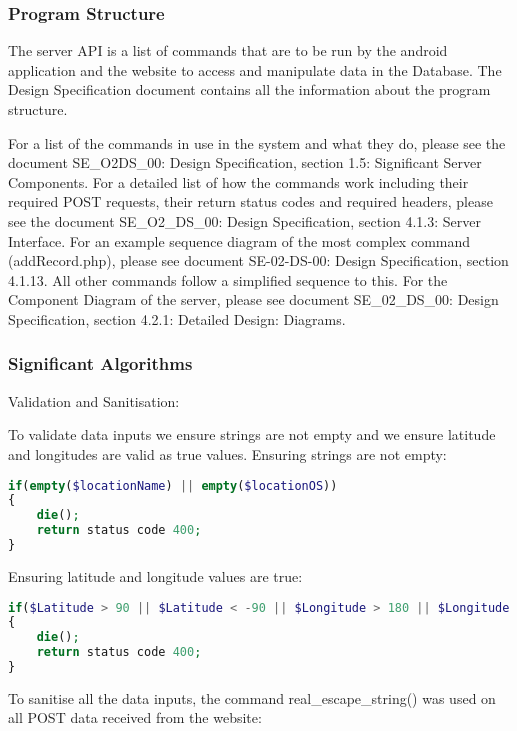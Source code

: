     \subsubsection{Program Structure}
        The server API is a list of commands that are to be run by the android application and the website to access and manipulate data in the Database. The Design Specification document contains all the information about the program structure.

        For a list of the commands in use in the system and what they do, please see the document SE\_O2\-DS\_00: Design Specification, section 1.5: Significant Server Components. For a detailed list of how the commands work including their required POST requests, their return status codes and required headers, please see the document SE\_O2\_DS\_00: Design Specification, section 4.1.3: Server Interface. For an example sequence diagram of the most complex command (addRecord.php), please see document SE-02-DS-00: Design Specification, section 4.1.13. All other commands follow a simplified sequence to this. For the Component Diagram of the server, please see document SE\_02\_DS\_00: Design Specification, section 4.2.1: Detailed Design: Diagrams. 

    \subsubsection{Significant Algorithms}

        Validation and Sanitisation:

        To validate data inputs we ensure strings are not empty and we ensure latitude and longitudes are valid as true values. Ensuring strings are not empty: 
        
        \begin{lstlisting}[language=php]
if(empty($locationName) || empty($locationOS))
{
    die();
    return status code 400;
}
        \end{lstlisting}

        Ensuring latitude and longitude values are true:
    
        \begin{lstlisting}[language=php]
if($Latitude > 90 || $Latitude < -90 || $Longitude > 180 || $Longitude < -180)
{
    die();
    return status code 400;
}
        \end{lstlisting}

        To sanitise all the data inputs, the command real\_escape\_string() was used on all POST data received from the website: 
        

